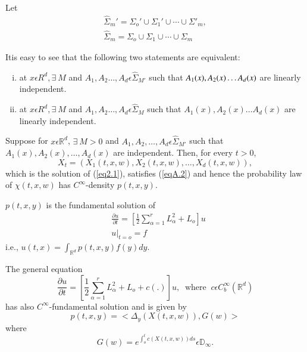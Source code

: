 Let
\begin{align*}
  \hat{\Sigma} _m '= {\Sigma}_o' \cup {\Sigma}_1 ' \cup \cdots \cup
      {\Sigma} '_m,\\ 
      \hat{\Sigma}_m = {\Sigma}_o \cup {\Sigma}_1 \cup \cdots \cup
          {\Sigma}_m 
\end{align*}

It\pageoriginale is easy to see that the following two statements are
equivalent: 
\begin{enumerate}[(i)]
\item at $x \epsilon  R^d, \exists~ M $ and $A_1, A_2 \ldots,A_d
  \epsilon  \hat{\Sigma}_{M'} $ such that $A_1 (x), A_2(x) \ldots\break
  A_d (x)$ are linearly independent. 

\item at $x \epsilon  R^d, \exists~ M$ and $A_1, A_2 \ldots, A_d
  \epsilon  \hat{\Sigma}_M$ such that $A_1(x), A_2 (x) \ldots
  A_d(x)$ are linearly independent. 
\end{enumerate}

\setcounter{theorem}{6}
\begin{theorem}\label{chap2:thm2.7}%
  Suppose for $x \epsilon  \mathbb{R}^d$, $\exists~ M > 0$ and $A_1,
  A_2, \ldots, A_d \epsilon   \hat{\Sigma}_{M'} $ such that  $A_1(x),
  A_2(x), \ldots, A_d (x)$ are independent. Then, for every $ t > 0$, 
  $$
  X_t = (X_1(t, x, w), X_2(t, x, w), \ldots, X_d (t, x, w)),
  $$
  which is the solution of (\ref{eq2.1}), satisfies (\ref{eqA.2}) and hence the
  probability law of $\chi (t, x, w)$ has $C^{\infty}$-density $p(t, x, y)$. 
\end{theorem}

\setcounter{remark}{0}
\begin{remark}%
  $p(t,x,y)$ is the fundamental solution of 
  \begin{align*}
    &\frac{\partial u}{\partial t} = \left[\frac{1}{2} \sum_{\alpha = 1}^{r}
      L^2_{\alpha} + L_o \right] u\\ 
    & u |_{t = o} = f
  \end{align*}
  i.e.,  \hspace{2cm} $u(t, x)= \int_{\mathbb{R}^{d}}p(t,x,y) f(y) dy$.
\end{remark}

\begin{remark}%
  The general equation
  $$
  \frac{\partial u}{\partial t}= \left[\frac{1}{2} \sum_{\alpha = 1}^{r}
    L_{\alpha}^{2} + L_o + c (.) \right] u, ~\text{ where }~ c \epsilon  C_b
  ^ \infty ( \mathbb{R}^d) 
  $$
  has also $C^\infty$-fundamental solution and is given by
$$
p (t,x,y) = < \Delta_y(X(t,x,w)), G(w)>
$$
where\pageoriginale
$$
G(w) = e^{\int^t_o c(X(t,x,w)) ds} \epsilon
  \mathbb{D}_{\infty}.
$$
\end{remark}

